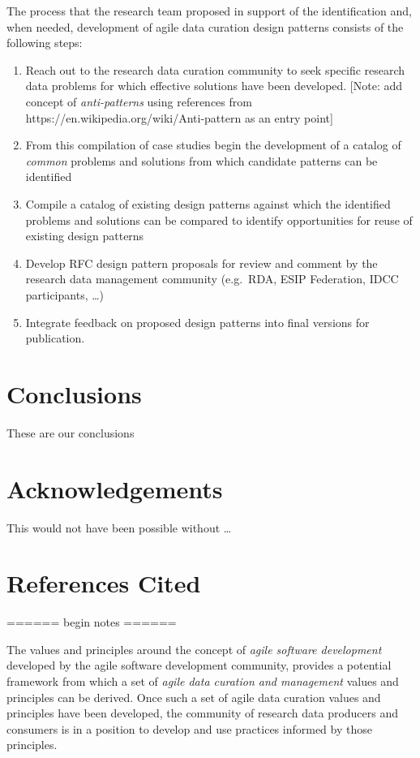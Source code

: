 \documentclass[paper]{ijdc-v9}
\begin{document}
The process that the research team proposed in support of the
identification and, when needed, development of agile data curation
design patterns consists of the following steps:

\begin{enumerate}
\def\labelenumi{\arabic{enumi}.}
\itemsep1pt\parskip0pt
\item
  Reach out to the research data curation community to seek specific
  research data problems for which effective solutions have been
  developed. {[}Note: add concept of \emph{anti-patterns} using
  references from https://en.wikipedia.org/wiki/Anti-pattern as an entry
  point{]}
\item
  From this compilation of case studies begin the development of a
  catalog of \emph{common} problems and solutions from which candidate
  patterns can be identified
\item
  Compile a catalog of existing design patterns against which the
  identified problems and solutions can be compared to identify
  opportunities for reuse of existing design patterns
\item
  Develop RFC design pattern proposals for review and comment by the
  research data management community (e.g.~RDA, ESIP Federation, IDCC
  participants, \ldots{})
\item
  Integrate feedback on proposed design patterns into final versions for
  publication.
\end{enumerate}

\section{Conclusions}\label{conclusions}

These are our conclusions

\section{Acknowledgements}\label{acknowledgements}

This would not have been possible without \ldots{}

\section{References Cited}\label{references-cited}

====== begin notes ======

The values and principles around the concept of \emph{agile software
development} developed by the agile software development community,
provides a potential framework from which a set of \emph{agile data
curation and management} values and principles can be derived. Once such
a set of agile data curation values and principles have been developed,
the community of research data producers and consumers is in a position
to develop and use practices informed by those principles.
\end{document}
